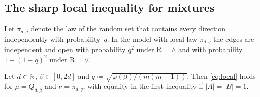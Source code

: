 \documentclass[11pt,letterpaper]{article}
\begin{document}
\subsection{The sharp local inequality for mixtures}

Let $\pi_{d,q}$ denote the law of the random set that contains every direction independently with probability~$q$. In the model with local law $\pi_{d,q}$ the edges are independent and open with probability $q^2$ under $\mathrm R=\wedge$ and with probability $1-(1-q)^2$ under $\mathrm R=\vee$.

\begin{lemma}\label{lem:mixture}
Let $d\in\mathbb N$, $\beta\in[0,2d]$ and $q\coloneqq\sqrt{\varphi(\beta)/(m(m-1))}$. Then \eqref{eq:local} holds for $\mu=Q_{d,\beta}$ and $\nu=\pi_{d,q}$, with equality in the first inequality if $|A|=|B|=1$.
\end{lemma}
\end{document}
